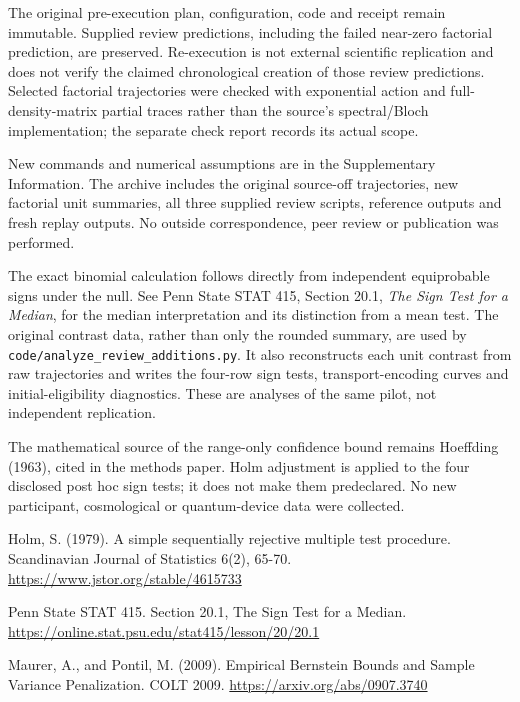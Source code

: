 \documentclass[
  10pt,
  a4paper,
]{article}
\makeatletter
\renewcommand\subsection{\@startsection{subsection}{2}{\z@}{-2ex \@plus -.8ex \@minus -.2ex}{.9ex \@plus .2ex}{\normalfont\large\bfseries}}
\makeatother
\begin{document}
The original pre-execution plan, configuration, code and receipt remain
immutable. Supplied review predictions, including the failed near-zero
factorial prediction, are preserved. Re-execution is not external
scientific replication and does not verify the claimed chronological
creation of those review predictions. Selected factorial trajectories
were checked with exponential action and full-density-matrix partial
traces rather than the source's spectral/Bloch implementation; the
separate check report records its actual scope.

New commands and numerical assumptions are in the Supplementary
Information. The archive includes the original source-off trajectories,
new factorial unit summaries, all three supplied review scripts,
reference outputs and fresh replay outputs. No outside correspondence,
peer review or publication was performed.

\subsection{10. Secondary-analysis
sources}\label{secondary-analysis-sources}

The exact binomial calculation follows directly from independent
equiprobable signs under the null. See Penn State STAT 415, Section
20.1, \emph{The Sign Test for a Median}, for the median interpretation
and its distinction from a mean test. The original contrast data, rather
than only the rounded summary, are used by
\nolinkurl{code/analyze_review_additions.py}. It also reconstructs each
unit contrast from raw trajectories and writes the four-row sign tests,
transport-encoding curves and initial-eligibility diagnostics. These are
analyses of the same pilot, not independent replication.

The mathematical source of the range-only confidence bound remains
Hoeffding (1963), cited in the methods paper. Holm adjustment is applied
to the four disclosed post hoc sign tests; it does not make them
predeclared. No new participant, cosmological or quantum-device data
were collected.

Holm, S. (1979). A simple sequentially rejective multiple test
procedure. Scandinavian Journal of Statistics 6(2), 65-70.
\url{https://www.jstor.org/stable/4615733}

Penn State STAT 415. Section 20.1, The Sign Test for a Median.
\url{https://online.stat.psu.edu/stat415/lesson/20/20.1}

Maurer, A., and Pontil, M. (2009). Empirical Bernstein Bounds and Sample
Variance Penalization. COLT 2009. \url{https://arxiv.org/abs/0907.3740}
\end{document}
